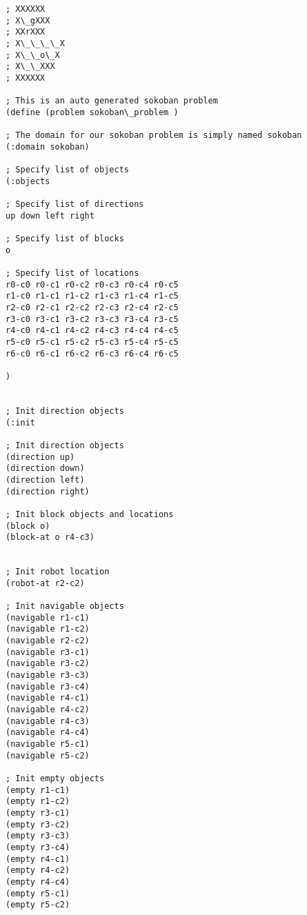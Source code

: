 \documentclass{article}
\begin{document}
    \begin{Verbatim}[commandchars=\\\{\}]
; XXXXXX 
; X\_gXXX 
; XXrXXX 
; X\_\_\_\_X 
; X\_\_o\_X 
; X\_\_XXX 
; XXXXXX 

; This is an auto generated sokoban problem
(define (problem sokoban\_problem )

; The domain for our sokoban problem is simply named sokoban
(:domain sokoban)

; Specify list of objects
(:objects 

; Specify list of directions
up down left right

; Specify list of blocks
o 

; Specify list of locations
r0-c0 r0-c1 r0-c2 r0-c3 r0-c4 r0-c5 
r1-c0 r1-c1 r1-c2 r1-c3 r1-c4 r1-c5 
r2-c0 r2-c1 r2-c2 r2-c3 r2-c4 r2-c5 
r3-c0 r3-c1 r3-c2 r3-c3 r3-c4 r3-c5 
r4-c0 r4-c1 r4-c2 r4-c3 r4-c4 r4-c5 
r5-c0 r5-c1 r5-c2 r5-c3 r5-c4 r5-c5 
r6-c0 r6-c1 r6-c2 r6-c3 r6-c4 r6-c5 

)


; Init direction objects
(:init

; Init direction objects
(direction up)
(direction down)
(direction left)
(direction right)

; Init block objects and locations
(block o)
(block-at o r4-c3)


; Init robot location
(robot-at r2-c2)

; Init navigable objects
(navigable r1-c1)
(navigable r1-c2)
(navigable r2-c2)
(navigable r3-c1)
(navigable r3-c2)
(navigable r3-c3)
(navigable r3-c4)
(navigable r4-c1)
(navigable r4-c2)
(navigable r4-c3)
(navigable r4-c4)
(navigable r5-c1)
(navigable r5-c2)

; Init empty objects
(empty r1-c1)
(empty r1-c2)
(empty r3-c1)
(empty r3-c2)
(empty r3-c3)
(empty r3-c4)
(empty r4-c1)
(empty r4-c2)
(empty r4-c4)
(empty r5-c1)
(empty r5-c2)


\end{Verbatim}
\end{document}

